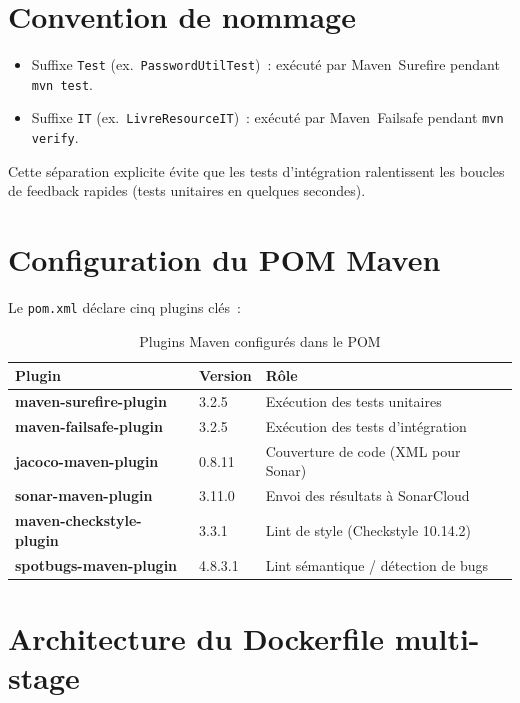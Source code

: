 \documentclass[12pt,a4paper]{report}
\begin{document}
\section{Convention de nommage}

\begin{itemize}
  \item Suffixe \texttt{Test} (ex.~\texttt{PasswordUtilTest})~: exécuté par
        Maven~Surefire pendant \texttt{mvn test}.
  \item Suffixe \texttt{IT} (ex.~\texttt{LivreResourceIT})~: exécuté par
        Maven~Failsafe pendant \texttt{mvn verify}.
\end{itemize}

Cette séparation explicite évite que les tests d'intégration ralentissent les
boucles de feedback rapides (tests unitaires en quelques secondes).

\section{Configuration du POM Maven}

Le \texttt{pom.xml} déclare cinq plugins clés~:

\begin{table}[h!]
\centering
\small
\renewcommand{\arraystretch}{1.3}
\begin{tabular}{>{\bfseries}p{4.5cm} p{2.5cm} p{6cm}}
\toprule
Plugin & Version & Rôle \\
\midrule
maven-surefire-plugin   & 3.2.5    & Exécution des tests unitaires \\
maven-failsafe-plugin   & 3.2.5    & Exécution des tests d'intégration \\
jacoco-maven-plugin     & 0.8.11   & Couverture de code (XML pour Sonar) \\
sonar-maven-plugin      & 3.11.0   & Envoi des résultats à SonarCloud \\
maven-checkstyle-plugin & 3.3.1    & Lint de style (Checkstyle 10.14.2) \\
spotbugs-maven-plugin   & 4.8.3.1  & Lint sémantique / détection de bugs \\
\bottomrule
\end{tabular}
\caption{Plugins Maven configurés dans le POM}
\label{tab:maven-plugins}
\end{table}

\section{Architecture du Dockerfile multi-stage}
\end{document}
